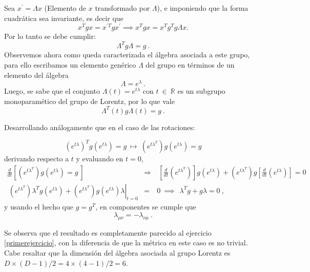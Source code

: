 Sea $x^{\prime} = \Lambda x$ (Elemento de $x$ transformado por $\Lambda$), e imponiendo que la forma cuadrática sea invariante, es decir que 
\begin{equation*}
    x^{T} g x = x^{\prime T} g x^{\prime} \implies x^{T} g x = x^{T} g^{T} g \Lambda x. 
\end{equation*}
Por lo tanto se debe cumplir:
\begin{equation}
    \Lambda^{T}g \Lambda = g~.
    \label{eqA31}
\end{equation}
Observemos ahora como queda caracterizada el álgebra asociada a este grupo, para ello escribamos un elemento genérico $\Lambda$ del grupo en términos de un elemento del álgebra 
\begin{equation}
    \Lambda = e^{\lambda}~.
\end{equation}
Luego, se sabe que el conjunto $\Lambda(t)=e^{t\lambda}$ con $t~\in ~ \mathbb{R}$ es un subgrupo monoparamético del grupo de Lorentz, por lo que vale
\begin{equation}
    \Lambda^{T} (t) g \Lambda (t) = g~.
\end{equation}

Desarrollando análogamente que en el caso de las rotaciones:

\begin{equation*}
    (e^{t\lambda })^{T}g (e^{t\lambda })=g ~\mapsto ~(e^{t\lambda
^{T}})g (e^{t\lambda })=g
\end{equation*}
derivando respecto a $t$ y evaluando en $t=0$,
\begin{eqnarray*}
\frac{d}{dt}\left[ (e^{t\lambda ^{T}})g (e^{t\lambda })=g ~\right] ~
&\Rightarrow &~\left[ \frac{d}{dt}(e^{t\lambda ^{T}})\right] g
(e^{t\lambda })+(e^{t\lambda ^{T}})g \left[ \frac{d}{dt}(e^{t\lambda })%
\right] =0 \\
\left. ~(e^{t\lambda ^{T}})\lambda ^{T}g (e^{t\lambda })+(e^{t\lambda
^{T}})g (e^{t\lambda })\lambda \right\vert _{t=0} &=&0~\implies ~\
\lambda ^{T}g +g \lambda =0~,
\end{eqnarray*}
y usando el hecho que $g = g^{T}$, en componentes se cumple que 
\begin{equation}
    \lambda_{\mu \nu} = - \lambda_{\nu \mu}~.
\end{equation}

Se observa que el resultado es completamente parecido al ejercicio \ref{primerejercicio}, con la diferencia de que la métrica en este caso es no trivial. Cabe resaltar que la dimensión del álgebra asociada al grupo Lorentz es $D \times (D-1)/2 = 4\times(4-1)/2=6$.\\

